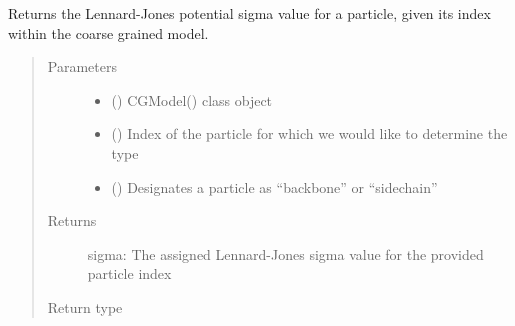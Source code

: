 \documentclass[letterpaper,12pt,english,openany,oneside]{sphinxmanual}
\begin{document}
\begin{fulllineitems}
\begin{fulllineitems}
\label{\detokenize{cg_model:cg_model.cgmodel.CGModel.get_sigma}}
Returns the Lennard-Jones potential sigma value for a particle, given its index within the coarse grained model.
\begin{quote}\begin{description}
\item[{Parameters}] \leavevmode\begin{itemize}
\item {} 
 () \textendash{} CGModel() class object

\item {} 
 () \textendash{} Index of the particle for which we would like to determine the type

\item {} 
 () \textendash{} Designates a particle as “backbone” or “sidechain”

\end{itemize}

\item[{Returns}] \leavevmode
sigma: The assigned Lennard-Jones sigma value for the provided particle index

\item[{Return type}] \leavevmode



\end{description}\end{quote}

\end{fulllineitems}



\end{fulllineitems}
\end{document}
